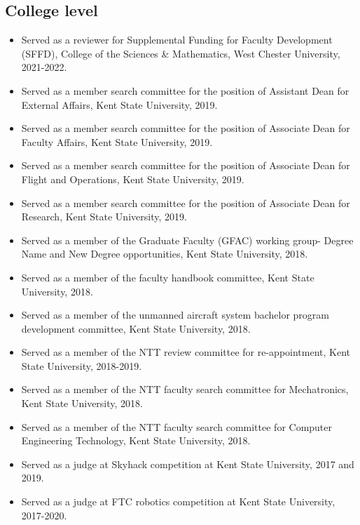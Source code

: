 \documentclass{article}
\begin{document}
\subsection*{College level}\vspace{-0.5em}
\begin{itemize}
\setlength\itemsep{-0.4em}
    \item Served as a reviewer for Supplemental Funding for Faculty Development (SFFD), College of the Sciences \& Mathematics, West Chester University, 2021-2022.
    \item Served as a member search committee for the position of Assistant Dean for External Affairs, Kent State University, 2019.
    \item Served as a member search committee for the position of Associate Dean for Faculty Affairs, Kent State University, 2019.
    \item Served as a member search committee for the position of Associate Dean for Flight and Operations, Kent State University, 2019.
    \item Served as a member search committee for the position of Associate Dean for Research, Kent State University, 2019.
    \item Served as a member of the Graduate Faculty (GFAC) working group- Degree Name and New Degree opportunities, Kent State University, 2018.
    \item Served as a member of the faculty handbook committee, Kent State University, 2018.
    \item Served as a member of the unmanned aircraft system bachelor program development committee, Kent State University, 2018.
    \item Served as a member of the NTT review committee for re-appointment, Kent State University, 2018-2019.
    \item Served as a member of the NTT faculty search committee for Mechatronics, Kent State University, 2018. 
    \item Served as a member of the NTT faculty search committee for Computer Engineering Technology, Kent State University, 2018. 
    \item Served as a judge at Skyhack competition at Kent State University, 2017 and 2019.
    \item Served as a judge at FTC robotics competition at Kent State University, 2017-2020.
\end{itemize}
\end{document}
